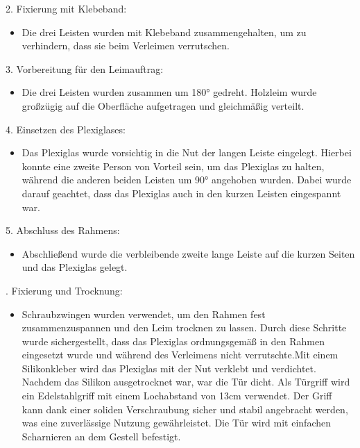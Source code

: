 2. Fixierung mit Klebeband:
\begin{itemize}
    \item Die drei Leisten wurden mit Klebeband zusammengehalten, um zu verhindern, dass sie beim Verleimen verrutschen.
\end{itemize}
\vspace{3mm}
3. Vorbereitung für den Leimauftrag:
\begin{itemize}
    \item Die drei Leisten wurden zusammen um 180° gedreht. Holzleim wurde großzügig auf die Oberfläche aufgetragen und gleichmäßig verteilt.
\end{itemize}

4. Einsetzen des Plexiglases:
\begin{itemize}
    \item Das Plexiglas wurde vorsichtig in die Nut der langen Leiste eingelegt. Hierbei konnte eine zweite Person von Vorteil sein, um das Plexiglas zu halten, während die anderen beiden Leisten um 90° angehoben wurden. Dabei wurde darauf geachtet, dass das Plexiglas auch in den kurzen Leisten eingespannt war.
\end{itemize}

5. Abschluss des Rahmens:
\begin{itemize}
    \item Abschließend wurde die verbleibende zweite lange Leiste auf die kurzen Seiten und das Plexiglas gelegt.
\end{itemize}
. Fixierung und Trocknung:
\begin{itemize}
    \item Schraubzwingen wurden verwendet, um den Rahmen fest zusammenzuspannen und den Leim trocknen zu lassen.
Durch diese Schritte wurde sichergestellt, dass das Plexiglas ordnungsgemäß in den Rahmen eingesetzt wurde und während des Verleimens nicht verrutschte.Mit einem Silikonkleber wird das Plexiglas mit der Nut verklebt und verdichtet. Nachdem das Silikon ausgetrocknet war, war die Tür dicht.
Als Türgriff wird ein Edelstahlgriff mit einem Lochabstand von 13cm verwendet. Der Griff kann dank einer soliden Verschraubung sicher und stabil angebracht werden, was eine zuverlässige Nutzung gewährleistet.
Die Tür wird mit einfachen Scharnieren an dem Gestell befestigt.
\end{itemize}

